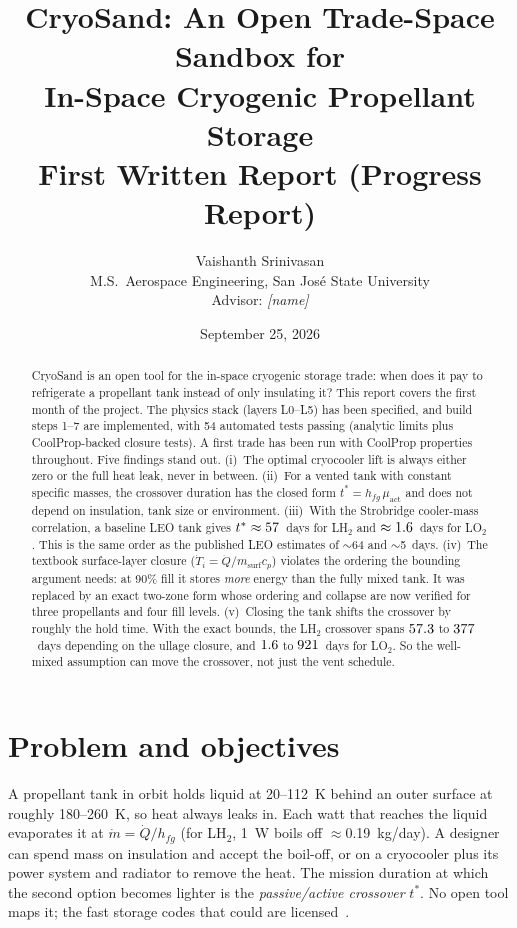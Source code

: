 \documentclass[11pt]{article}
\title{\textbf{CryoSand: An Open Trade-Space Sandbox for\\In-Space Cryogenic Propellant Storage}\\[4pt]
\large First Written Report (Progress Report)}
\author{Vaishanth Srinivasan\\ M.S.\ Aerospace Engineering, San Jos\'e State University\\
Advisor: \textit{[name]}}
\date{September 25, 2026}
\newcommand{\Qd}{\dot Q}
\newcommand{\md}{\dot m}
\begin{document}
\maketitle
\vspace{-1.5em}

\begin{abstract}
\noindent
CryoSand is an open tool for the in-space cryogenic storage trade: when does it pay to refrigerate a
propellant tank instead of only insulating it? This report covers the first month of the project. The
physics stack (layers L0--L5) has been specified, and build steps 1--7 are implemented, with 54 automated
tests passing (analytic limits plus CoolProp-backed closure tests). A first trade has been run with CoolProp
properties throughout. Five findings stand out.
(i)~The optimal cryocooler lift is always either zero or the full heat leak, never in between.
(ii)~For a vented tank with constant specific masses, the crossover duration has the closed form
$t^*=h_{fg}\,\mu_\text{act}$ and does not depend on insulation, tank size or environment.
(iii)~With the Strobridge cooler-mass correlation, a baseline LEO tank gives $t^*\approx57$~days for LH$_2$
and $\approx1.6$~days for LO$_2$. This is the same order as the published LEO estimates of $\sim$64 and $\sim$5~days.
(iv)~The textbook surface-layer closure ($\dot T_i=\Qd/m_\text{surf}c_p$) violates the ordering the bounding
argument needs: at 90\% fill it stores \emph{more} energy than the fully mixed tank. It was replaced by an
exact two-zone form whose ordering and collapse are now verified for three propellants and four fill levels.
(v)~Closing the tank shifts the crossover by roughly the hold time. With the exact bounds, the LH$_2$
crossover spans $57.3$ to $377$~days depending on the ullage closure, and $1.6$ to $921$~days for LO$_2$.
So the well-mixed assumption can move the crossover, not just the vent schedule.
\end{abstract}

\section{Problem and objectives}
A propellant tank in orbit holds liquid at 20--112~K behind an outer surface at roughly 180--260~K, so heat always leaks in.
Each watt that reaches the liquid evaporates it at $\md=\Qd/h_{fg}$ (for LH$_2$, 1~W boils off
$\approx$0.19~kg/day). A designer can spend mass on insulation and accept the boil-off, or on a cryocooler
plus its power system and radiator to remove the heat. The mission duration at which the second option
becomes lighter is the \emph{passive/active crossover} $t^*$. No open tool maps it; the fast storage codes
that could are licensed~\cite{zumbo}.
\end{document}
